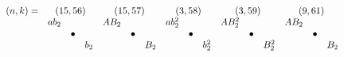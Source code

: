 \documentclass{article}
\begin{document}
\(
\begin{array}{crclrclrclrclrclrclrclrcl}
  (n,k)= & \multicolumn{3}{c}{(15,56)} & \multicolumn{3}{c}{(15,57)} & \multicolumn{3}{c}{(3,58)} & \multicolumn{3}{c}{(3,59)} & \multicolumn{3}{c}{(9,61)} &  \\
  & ab_2 & & & AB_2 & & & ab_2^2 & & & AB_2^2 & & & AB_2 & & & & & & & & \\
  & & \bullet & & & \bullet & & & \bullet & & & \bullet & & & \bullet & & & & & & & \\
  & & & b_2 & & & B_2 & & & b_2^2& & & B_2^2 & & & B_2 & & && & & 
\end{array}
\)\\
\end{document}
